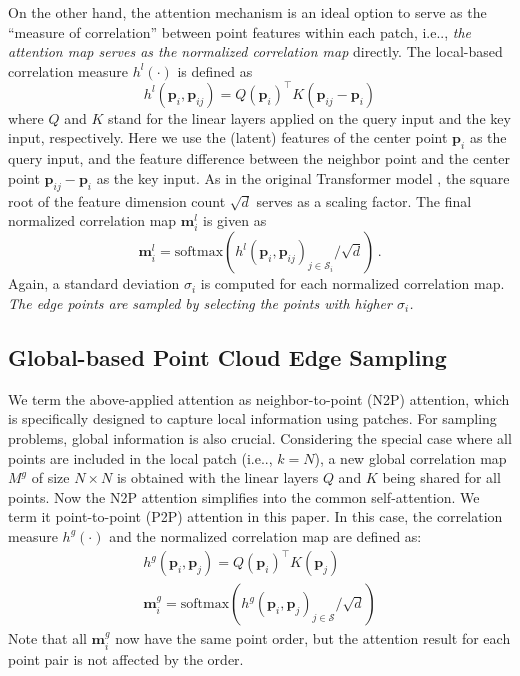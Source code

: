 \documentclass[10pt,twocolumn,letterpaper]{article}
\makeatletter
\newcommand{\bm}{\mathbf{m}}\newcommand{\bM}{\mathbf{M}}
\newcommand{\bp}{\mathbf{p}}\newcommand{\bP}{\mathbf{P}}
\newcommand{\cS}{\mathcal{S}}
\DeclareRobustCommand\onedot{\futurelet\@let@token\@onedot}
\def\@onedot{\ifx\@let@token.\else.\null\fi\xspace}
\def\ie{i.e\onedot} \def\Ie{I.e\onedot}
\makeatother
\begin{document}
On the other hand, the attention mechanism is an ideal option to serve as the \enquote{measure of correlation} between point features within each patch, \ie, \emph{the attention map serves as the normalized correlation map} directly. The local-based correlation measure $h^l(\cdot)$ is defined as
\begin{equation}
h^l(\bp_i, \bp_{ij}) = Q(\bp_i)^{\top} K(\bp_{ij} - \bp_i)
\end{equation}
where $Q$ and $K$ stand for the linear layers applied on the query input and the key input, respectively. Here we use the (latent) features of the center point $\bp_i$ as the query input, and the feature difference between the neighbor point and the center point $\bp_{ij} - \bp_i$ as the key input. 
As in the original Transformer model \cite{vaswani2017attention}, the square root of the feature dimension count  $\sqrt{d}$ serves as a scaling factor.
The final normalized correlation map $\bm^l_i$ is given as
\begin{equation}
\bm^l_i = \mathrm{softmax}\left(h^l(\bp_i, \bp_{ij})_{j\in \cS_i}/\sqrt{d}\right)\,.
\end{equation}
Again, a standard deviation $\sigma_i$ is computed for each normalized correlation map. \emph{The edge points are sampled by selecting the points with higher $\sigma_i$.}
 

\subsection{Global-based Point Cloud Edge Sampling}
We term the above-applied attention as neighbor-to-point (N2P) attention, which is specifically designed to capture local information using patches. For sampling problems, global information is also crucial. 
Considering the special case where all points are included in the local patch (\ie, $k=N$), a new global correlation map $M^g$ of size $N \times N$ is obtained with the linear layers $Q$ and $K$ being shared for all points. Now the N2P attention simplifies into the common self-attention. We term it point-to-point (P2P) attention in this paper.
In this case, the correlation measure $h^g(\cdot)$ and the normalized correlation map are defined as:
\begin{gather}
h^g(\bp_i, \bp_j) = Q(\bp_i)^{\top} K(\bp_j)\\
\bm^g_i = \mathrm{softmax}\left(h^g(\bp_i, \bp_{j})_{j\in \cS}/\sqrt{d}\right)
\end{gather}
Note that all $\bm^g_i$ now have the same point order, but the attention result for each point pair is not affected by the order.
\end{document}
